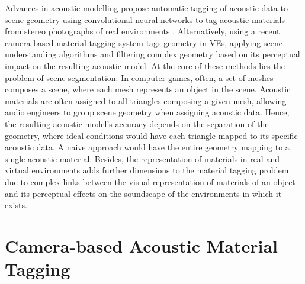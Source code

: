 Advances in acoustic modelling propose automatic tagging of acoustic data to scene geometry using convolutional neural networks to tag acoustic materials from stereo photographs of real environments \cite{li2018scene}. Alternatively, using a recent camera-based material tagging system tags geometry in VEs, applying scene understanding algorithms and filtering complex geometry based on its perceptual impact on the resulting acoustic model. At the core of these methods lies the problem of scene segmentation. In computer games, often, a set of meshes composes a scene, where each mesh represents an object in the scene. Acoustic materials are often assigned to all triangles composing a given mesh, allowing audio engineers to group scene geometry when assigning acoustic data. Hence, the resulting acoustic model's accuracy depends on the separation of the geometry, where ideal conditions would have each triangle mapped to its specific acoustic data. A naive approach would have the entire geometry mapping to a single acoustic material. Besides, the representation of materials in real and virtual environments adds further dimensions to the material tagging problem due to complex links between the visual representation of materials of an object and its perceptual effects on the soundscape of the environments in which it exists.\par

\section{Camera-based Acoustic Material Tagging}
